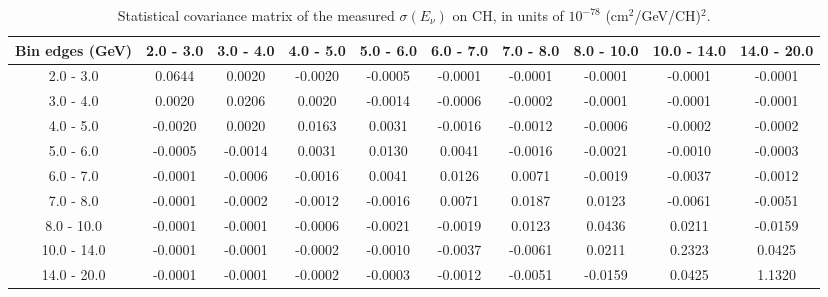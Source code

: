 \documentclass[aps,prl,twocolumn,superscriptaddress,nofootinbib]{revtex4-1}
\begin{document}
\begin{table}[h!]
  \centering
  \caption{Statistical covariance matrix of the measured $\sigma(E_{\nu})$ on CH, in units of $10^{-78}$ (cm$^{2}$/GeV/CH)$^{2}$.}
    \begin{tabular}{c||ccccccccc}
      Bin edges (GeV) & 2.0 - 3.0 & 3.0 - 4.0 & 4.0 - 5.0 & 5.0 - 6.0 & 6.0 - 7.0 & 7.0 - 8.0 & 8.0 - 10.0 & 10.0 - 14.0 & 14.0 - 20.0 \\
\hline \hline
        2.0 - 3.0 &  0.0644 &  0.0020 & -0.0020 & -0.0005 & -0.0001 & -0.0001 & -0.0001 & -0.0001 & -0.0001 \\
        3.0 - 4.0 &  0.0020 &  0.0206 &  0.0020 & -0.0014 & -0.0006 & -0.0002 & -0.0001 & -0.0001 & -0.0001 \\
        4.0 - 5.0 & -0.0020 &  0.0020 &  0.0163 &  0.0031 & -0.0016 & -0.0012 & -0.0006 & -0.0002 & -0.0002 \\
        5.0 - 6.0 & -0.0005 & -0.0014 &  0.0031 &  0.0130 &  0.0041 & -0.0016 & -0.0021 & -0.0010 & -0.0003 \\
        6.0 - 7.0 & -0.0001 & -0.0006 & -0.0016 &  0.0041 &  0.0126 &  0.0071 & -0.0019 & -0.0037 & -0.0012 \\
        7.0 - 8.0 & -0.0001 & -0.0002 & -0.0012 & -0.0016 &  0.0071 &  0.0187 &  0.0123 & -0.0061 & -0.0051 \\
       8.0 - 10.0 & -0.0001 & -0.0001 & -0.0006 & -0.0021 & -0.0019 &  0.0123 &  0.0436 &  0.0211 & -0.0159 \\
      10.0 - 14.0 & -0.0001 & -0.0001 & -0.0002 & -0.0010 & -0.0037 & -0.0061 &  0.0211 &  0.2323 &  0.0425 \\
      14.0 - 20.0 & -0.0001 & -0.0001 & -0.0002 & -0.0003 & -0.0012 & -0.0051 & -0.0159 &  0.0425 &  1.1320 \\
    \end{tabular}
  \label{tablecov:CH_Statistical_Enu}
\end{table}
\end{document}
